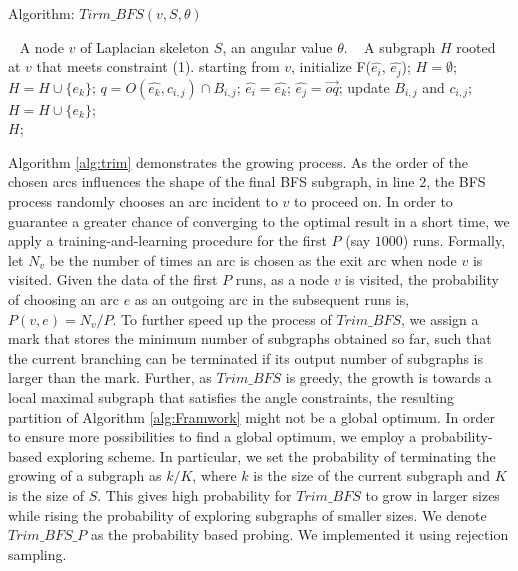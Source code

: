 \begin{algorithm}[t]
\caption{Algorithm: $Tirm\_BFS(v, S,\theta)$}
\label{alg:trim}
\begin{algorithmic}[1]
\REQUIRE~
A node $v$ of Laplacian skeleton $S$, an angular value $\theta$.
\ENSURE~
 A subgraph $H$ rooted at $v$ that meets constraint (1).
\STATE starting from $v$, initialize F($\hat{e_i}$, $\hat{e_j}$); $H = \emptyset $;
  \STATE  $H = H \cup \{e_k\}$;
  \STATE $q = O( \hat{e_k}, c_{i,j}) \cap B_{i,j}$;
  \STATE  $\hat{e_i}=  \hat{e_k}$;
  \STATE $\hat{e_j} =  \overrightarrow{oq}$;
  \STATE  update $B_{i,j}$ and $c_{i,j}$;
  \STATE  $H = H \cup \{e_k\}$;
  \ENDIF
\ENDWHILE
\label{code:fram:select} \\
\RETURN  $H$;
\end{algorithmic}
\end{algorithm}

Algorithm \ref{alg:trim} demonstrates the growing process. As the order of the chosen arcs influences the shape of the final BFS subgraph, in line $2$, the BFS process randomly chooses an arc incident to $v$ to proceed on. In order to guarantee a greater chance of converging to the optimal result in a short time, we apply a training-and-learning procedure for the first $P$ (say $1000$) runs. Formally, let $N_v$ be the number of times an arc is chosen as the exit arc when node $v$ is visited. Given the data of the first $P$ runs, as a node $v$ is visited, the probability of choosing an arc $e$ as an outgoing arc in the subsequent runs is, $P(v, e) = N_v/P$. To further speed up the process of $Trim\_BFS$, we assign a mark that stores the minimum number of subgraphs obtained so far, such that the current branching can be terminated if its output number of subgraphs is larger than the mark. Further, as $Trim\_BFS$ is greedy, the growth is towards a local maximal subgraph that satisfies the angle constraints, the resulting partition of Algorithm \ref{alg:Framwork} might not be a global optimum. In order to ensure more possibilities to find a global optimum, we employ a probability-based exploring scheme. In particular, we set the probability of terminating the growing of a subgraph as $k/K$, where $k$ is the size of the current subgraph and $K$ is the size of $S$. This gives high probability for $Trim\_BFS$ to grow in larger sizes while rising the probability of exploring subgraphs of smaller sizes. We denote $Trim\_BFS\_P$ as the probability based probing. We implemented it using rejection sampling.

